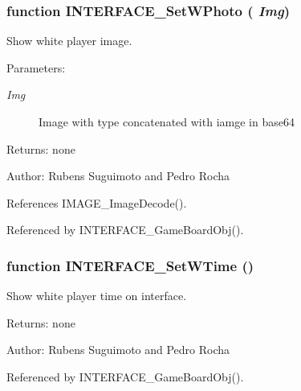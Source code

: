 \subsubsection[INTERFACE\_\-SetWPhoto]{\setlength{\rightskip}{0pt plus 5cm}function INTERFACE\_\-SetWPhoto ( {\em Img})}\label{interface_2game_8js_63352895de12e8ff975333d719fcb7f8}


Show white player image. 

\begin{Desc}
\item[Parameters:]
\begin{description}
\item[{\em Img}]Image with type concatenated with iamge in base64 \end{description}
\end{Desc}
\begin{Desc}
\item[Returns:]none \end{Desc}
\begin{Desc}
\item[Author:]Rubens Suguimoto and Pedro Rocha \end{Desc}


References IMAGE\_\-ImageDecode().

Referenced by INTERFACE\_\-GameBoardObj().
\subsubsection[INTERFACE\_\-SetWTime]{\setlength{\rightskip}{0pt plus 5cm}function INTERFACE\_\-SetWTime ()}\label{interface_2game_8js_b208e2e3fadd324f4b9982c35177bdb6}


Show white player time on interface. 

\begin{Desc}
\item[Returns:]none \end{Desc}
\begin{Desc}
\item[Author:]Rubens Suguimoto and Pedro Rocha \end{Desc}


Referenced by INTERFACE\_\-GameBoardObj().
